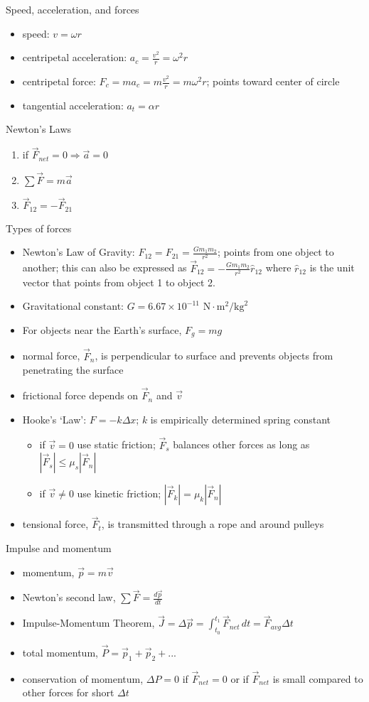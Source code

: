 \documentclass[11pt,letterpaper]{article}
\begin{document}
\clearpage
\noindent Speed, acceleration, and forces
\begin{itemize}
\item speed: $v=\omega{r}$
\item centripetal acceleration: $a_c=\displaystyle\frac{v^2}{r}=\omega^2r$
\item centripetal force: $F_c=ma_c=m\displaystyle\frac{v^2}{r}=m\omega^2r$; points toward center of circle
\item tangential acceleration: $a_t=\alpha{r}$
\end{itemize}
Newton's Laws
\begin{enumerate}
\item if $\vec{F}_{net}=0\Rightarrow \vec{a}=0$
\item $\displaystyle\sum\vec{F}=m\vec{a}$
\item $\vec{F}_{12}=-\vec{F}_{21}$
\end{enumerate}
Types of forces
\begin{itemize}
\item Newton's Law of Gravity: $F_{12}=F_{21}=\displaystyle\frac{Gm_1m_2}{r^2}$; points from one object to another; this can also be expressed as $\vec{F}_{12}=\displaystyle-\frac{Gm_1m_2}{r^2}\hat{r}_{12}$ where $\hat{r}_{12}$ is the unit vector that points from object 1 to object 2.
\item Gravitational constant: $G=6.67\times{10}^{-11}\mbox{ N}\cdot\mbox{m}^2/\mbox{kg}^2$
\item For objects near the Earth's surface, $F_g=mg$
\item normal force, $\vec{F}_n$, is perpendicular to surface and prevents objects from penetrating the surface
\item frictional force depends on $\vec{F}_n$ and $\vec{v}$
\item Hooke's `Law': $F=-k\Delta{x}$; $k$ is empirically determined spring constant
\begin{itemize}
\item if $\vec{v}=0$ use static friction; $\vec{F}_s$ balances other forces as long as $\left|\vec{F}_s\right|\leq\mu_s\left|\vec{F}_n\right|$
\item if $\vec{v}\neq{0}$ use kinetic friction; $\left|\vec{F}_k\right|=\mu_k\left|\vec{F}_n\right|$
\end{itemize}
\item tensional force, $\vec{F}_t$, is transmitted through a rope and around pulleys
\end{itemize}
Impulse and momentum
\begin{itemize}
\item momentum, $\vec{p}=m\vec{v}$
\item Newton's second law, $\displaystyle\sum\vec{F}=\displaystyle\frac{d\vec{p}}{dt}$
\item Impulse-Momentum Theorem, $\vec{J}=\Delta{\vec{p}}=\displaystyle\int_{t_0}^{t_1}\vec{F}_{net}\,dt=\vec{F}_{avg}\Delta{t}$
\item total momentum, $\vec{P}=\vec{p}_1+\vec{p}_2+...$
\item conservation of momentum, $\Delta{P}=0$ if $\vec{F}_{net}=0$ or if $\vec{F}_{net}$ is small compared to other forces for short $\Delta{t}$
\end{itemize}
\end{document}
